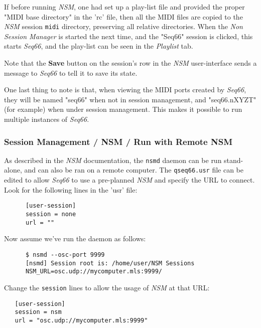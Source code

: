 
   If before running \textsl{NSM},
   one had set up a play-list file and provided the proper "MIDI
   base directory" in the 'rc' file, then all the MIDI files are copied to
   the \textsl{NSM} session \texttt{midi} directory,
   preserving all relative directories.
   When the \textsl{Non Session Manager} is started the next time, and the
   "Seq66" session is clicked, this starts \textsl{Seq66}, and the play-list can
   be seen in the \textsl{Playlist} tab.

   Note that the \textbf{Save} button on the session's row in the
   \textsl{NSM} user-interface sends a message to \textsl{Seq66}
   to tell it to save its state.

   One last thing to note is that, when viewing the MIDI ports created by
   \textsl{Seq66}, they will be named "seq66" when not in session management,
   and "seq66.nXYZT" (for example) when under session management.  This makes
   it possible to run multiple instances of \textsl{Seq66}.

\subsubsection{Session Management / NSM / Run with Remote NSM}
\label{subsec:sessions_nsm_before_using_nsm}

   As described in the \textsl{NSM} documentation, the \texttt{nsmd} daemon can
   be run stand-alone, and can also be ran on a remote computer.
   The \texttt{qseq66.usr} file can be edited to allow \textsl{Seq66} to
   use a pre-planned \textsl{NSM} and specify the URL to connect.
   Look for the following lines in the 'usr' file:

   \begin{verbatim}
      [user-session]
      session = none
      url = ""
   \end{verbatim}

   Now assume we've run the daemon as follows:

   \begin{verbatim}
      $ nsmd --osc-port 9999
      [nsmd] Session root is: /home/user/NSM Sessions
      NSM_URL=osc.udp://mycomputer.mls:9999/
   \end{verbatim}

   Change the \texttt{session} lines to allow the usage of
   \textsl{NSM} at that URL:

\begin{verbatim}
   [user-session]
   session = nsm
   url = "osc.udp://mycomputer.mls:9999"
\end{verbatim}

